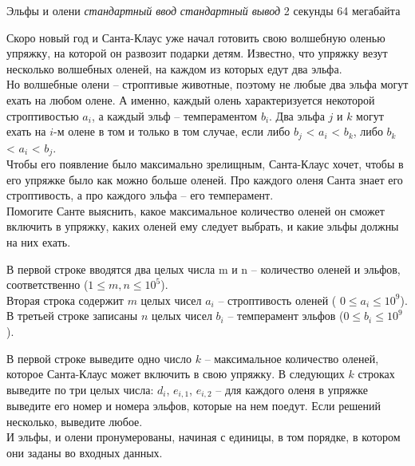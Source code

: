 \begin{problem}%
{Эльфы и олени}%
{\textsl{стандартный ввод}}%
{\textsl{стандартный вывод}}%
{2 секунды}%
{64 мегабайта}%
{}

Скоро новый год и Санта-Клаус уже начал готовить свою волшебную оленью упряжку, на которой он развозит подарки детям. Известно, что упряжку везут несколько волшебных оленей, на каждом из которых едут два эльфа.\\

Но волшебные олени – строптивые животные, поэтому не любые два эльфа могут ехать на любом олене. А именно, каждый олень характеризуется некоторой строптивостью $a_i$, а каждый эльф – темпераментом $b_i$. Два эльфа $j$ и $k$ могут ехать на $i$-м олене в том и только в том случае, если либо $b_j$ < $a_i$ < $b_k$, либо $b_k$ < $a_i$ < $b_j$.\\

Чтобы его появление было максимально зрелищным, Санта-Клаус хочет, чтобы в его упряжке было как можно больше оленей. Про каждого оленя Санта знает его строптивость, а про каждого эльфа – его темперамент.\\

Помогите Санте выяснить, какое максимальное количество оленей он сможет включить в упряжку, каких оленей ему следует выбрать, и какие эльфы должны на них ехать.

\InputFile

В первой строке вводятся два целых числа m и n – количество оленей и эльфов, соответственно ($1 \le m, n \le 10^5$).\\

Вторая строка содержит $m$ целых чисел $a_i$ – строптивость оленей ( $0 \le a_i \le 10^9$). В третьей строке записаны $n$ целых чисел $b_i$ – темперамент эльфов ($0 \le b_i \le 10^9$).

\OutputFile

В первой строке  выведите одно число $k$ – максимальное количество оленей, которое Санта-Клаус может включить в свою упряжку. В следующих $k$ строках выведите по три целых числа: $d_i$, $e_{i, 1}$, $e_{i, 2}$ – для каждого оленя в упряжке выведите его номер и номера эльфов, которые на нем поедут. Если решений несколько, выведите любое.\\

И эльфы, и олени пронумерованы, начиная с единицы, в том порядке, в котором они заданы во входных данных.

\Examples

\begin{example}
%
\end{example}
\end{problem}
